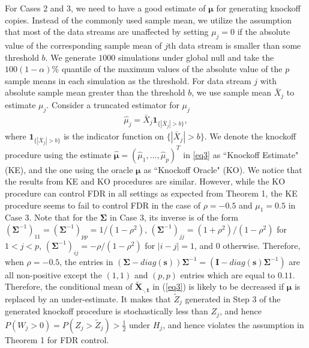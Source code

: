 \documentclass[]{interact}
\theoremstyle{plain}%
\theoremstyle{definition}
\theoremstyle{remark}
\begin{document}
For Cases 2 and 3, we need to have a good estimate of $\bm\mu$ for generating knockoff copies. Instead of the commonly used sample mean, we utilize the assumption that most of the data streams are unaffected by setting $\mu_j=0$ if the absolute value of the corresponding sample mean of $j$th data stream is smaller than some threshold $b$. We generate $1000$ simulations under global null and take the $100(1-\alpha)\%$ quantile of the maximum values of the absolute value of the $p$ sample means in each simulation as the threshold. For data stream $j$ with absolute sample mean greater than the threshold $b$, we use sample mean $\bar{X}_j$ to estimate $\mu_j$. Consider a truncated estimator for $\mu_j$
\begin{align}
\hat{\mu}_j=\bar{X}_j\mathbf{1}_{\{ |\bar{X}_j|>b \}},\label{truncated mu}
\end{align} 
where $\mathbf{1}_{\{ |\bar{X}_j|>b \}}$ is the indicator function on $\{ |\bar{X}_j|>b \}$. We denote the knockoff procedure using the estimate $\hat{\bm\mu}=(\hat{\mu}_1,\ldots,\hat{\mu}_p)^T$ in \eqref{eq3} as ``Knockoff Estimate" (KE), and the one using the oracle $\bm\mu$ as ``Knockoff Oracle" (KO). We notice that the results from KE and KO procedures are similar. However, while the KO procedure can control FDR in all settings as expected from Theorem 1, the KE procedure seems to fail to control FDR in the case of $\rho=-0.5$ and $\mu_1=0.5$ in Case 3. Note that for the $\bm\Sigma$ in Case 3, its inverse is of the form $(\bm\Sigma^{-1})_{11}=(\bm\Sigma^{-1})_{pp}=1/(1-\rho^2)$, $(\bm\Sigma^{-1})_{jj}=(1+\rho^2)/(1-\rho^2)$ for $1<j<p$, $(\bm\Sigma^{-1})_{ij}=-\rho/(1-\rho^2)$ for $|i-j|=1$, and 0 otherwise. Therefore, when $\rho=-0.5$, the entries in $(\bm \Sigma - diag (\bm s)) \bm \Sigma^{-1} = (\bm I - diag(\bm s) \bm \Sigma^{-1})$ are all non-positive except the $(1,1)$ and $(p,p)$ entries which are equal to $0.11$. Therefore, the conditional mean of $\bm{\tilde X_{\cdot, t}}$ in (\ref{eq3}) is likely to be decreased if $\bm \mu$ is replaced by an under-estimate. It makes that $\tilde Z_j$ generated in Step 3 of the generated knockoff procedure is stochastically less than $Z_j$, and hence $P(W_j > 0) = P(Z_j > \tilde Z_j) > \frac{1}{2}$ under $H_j$, and hence violates the assumption in Theorem 1 for FDR control.
\end{document}
